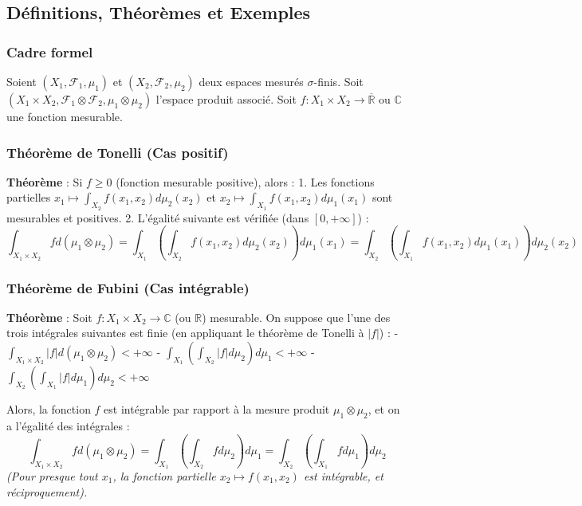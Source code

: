 \documentclass[11pt,a4paper]{article}
\begin{document}
\subsection{Définitions, Théorèmes et Exemples}

\subsubsection{Cadre formel}

Soient $(X_1, \mathcal{F}_1, \mu_1)$ et $(X_2, \mathcal{F}_2, \mu_2)$ deux espaces mesurés $\sigma$-finis.
Soit $(X_1 \times X_2, \mathcal{F}_1 \otimes \mathcal{F}_2, \mu_1 \otimes \mu_2)$ l'espace produit associé.
Soit $f : X_1 \times X_2 \to \overline{\mathbb{R}}$ ou $\mathbb{C}$ une fonction mesurable.

\subsubsection{Théorème de Tonelli (Cas positif)}

\textbf{Théorème} :
Si $f \ge 0$ (fonction mesurable positive), alors :
1. Les fonctions partielles $x_1 \mapsto \int_{X_2} f(x_1, x_2) d\mu_2(x_2)$ et $x_2 \mapsto \int_{X_1} f(x_1, x_2) d\mu_1(x_1)$ sont mesurables et positives.
2. L'égalité suivante est vérifiée (dans $[0, +\infty]$) :
   $$ \int_{X_1 \times X_2} f d(\mu_1 \otimes \mu_2) = \int_{X_1} \left( \int_{X_2} f(x_1, x_2) d\mu_2(x_2) \right) d\mu_1(x_1) = \int_{X_2} \left( \int_{X_1} f(x_1, x_2) d\mu_1(x_1) \right) d\mu_2(x_2) $$

\subsubsection{Théorème de Fubini (Cas intégrable)}

\textbf{Théorème} :
Soit $f : X_1 \times X_2 \to \mathbb{C}$ (ou $\mathbb{R}$) mesurable.
On suppose que l'une des trois intégrales suivantes est finie (en appliquant le théorème de Tonelli \`a $|f|$) :
- $\int_{X_1 \times X_2} |f| d(\mu_1 \otimes \mu_2) < +\infty$
- $\int_{X_1} \left( \int_{X_2} |f| d\mu_2 \right) d\mu_1 < +\infty$
- $\int_{X_2} \left( \int_{X_1} |f| d\mu_1 \right) d\mu_2 < +\infty$

Alors, la fonction $f$ est intégrable par rapport \`a la mesure produit $\mu_1 \otimes \mu_2$, et on a l'égalité des intégrales :
$$ \int_{X_1 \times X_2} f d(\mu_1 \otimes \mu_2) = \int_{X_1} \left( \int_{X_2} f d\mu_2 \right) d\mu_1 = \int_{X_2} \left( \int_{X_1} f d\mu_1 \right) d\mu_2 $$
\textit{(Pour presque tout $x_1$, la fonction partielle $x_2 \mapsto f(x_1, x_2)$ est intégrable, et réciproquement).}
\end{document}
